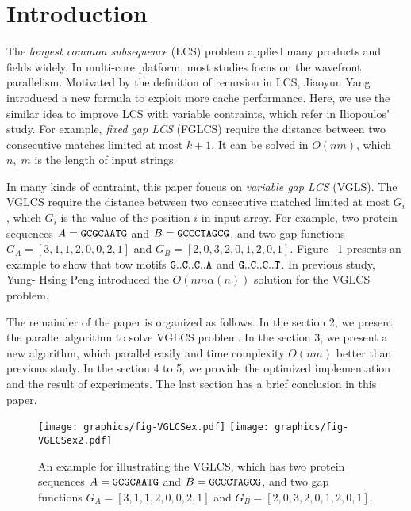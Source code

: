 \section{Introduction} %
\label{sec:Introduction}

The \emph{longest common subsequence} (LCS) problem applied many
products and fields widely.  In multi-core platform, most studies
focus on the wavefront parallelism. Motivated by the definition of
recursion in LCS, Jiaoyun Yang introduced a new formula to exploit
more cache performance.  Here, we use the similar idea to improve LCS
with variable contraints, which refer in Iliopoulos' study.  For
example, \emph{fixed gap LCS} (FGLCS) require the distance between two
consecutive matches limited at most $k+1$.  It can be solved in
$O(nm)$, which $n, \; m$ is the length of input strings.

In many kinds of contraint, this paper foucus on \emph{variable gap
LCS} (VGLS). The VGLCS require the distance between two consecutive
matched limited at most $G_i$, which $G_i$ is the value of the
position $i$ in input array. For example, two protein sequences $A =
\tt{GCGCAATG}$ and $B = \tt{GCCCTAGCG}$, and two gap functions $G_A =
[3, 1, 1, 2, 0, 0, 2, 1]$ and $G_B = [2, 0, 3, 2, 0, 1, 2, 0, 1]$.
Figure ~\ref{fig:VGLCSex} presents an example to show that tow motifs
$\tt{G..C..C..A}$ and $\tt{G..C..C..T}$.  In previous study, Yung-
Hsing Peng \cite{Yang2010AnEP} introduced the $O(nm \alpha(n))$
solution for the VGLCS problem.

The remainder of the paper is organized as follows. In the section 2,
we present the parallel algorithm to solve VGLCS problem. In the
section 3, we present a new algorithm, which parallel easily and time
complexity $O(nm)$ better than previous study. In the section 4 to 5,
we provide the optimized implementation and the result of experiments.
The last section has a brief conclusion in this paper.

\begin{figure}[!thb]
  \centering
  \texttt{[image: graphics/fig-VGLCSex.pdf]}
  \texttt{[image: graphics/fig-VGLCSex2.pdf]}

  \caption{   An example for illustrating the VGLCS, which has two
protein sequences $A = \tt{GCGCAATG}$ and $B = \tt{GCCCTAGCG}$, and
two gap functions $G_A = [3, 1, 1, 2, 0, 0, 2, 1]$ and $G_B = [2, 0,
3, 2, 0, 1, 2, 0, 1]$.   }
  
  \label{fig:VGLCSex}
\end{figure}